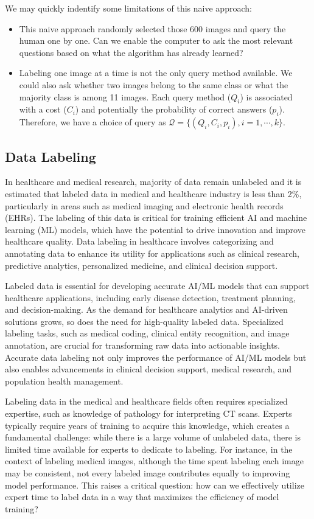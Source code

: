 \documentclass[12pt]{article}
\def\cal{\mathcal}
\def\calQ{{\cal Q}} %
\begin{document}
We may quickly indentify some limitations of this naive approach:

\begin{itemize}
	\item This naive approach randomly selected those 600 images and query the human one by one. Can we enable the computer to ask the most relevant questions based on what the algorithm has already learned? 
	\item Labeling one image at a time is not the only query method available. We could also ask whether two images belong to the same class or what the majority class is among 11 images. Each query method ($Q_i$) is associated with a cost ($C_i$) and potentially the probability of correct answers ($p_i$). Therefore, we have a choice of query as $\calQ = \{(Q_i, C_i, p_i), i=1,\cdots, k\}$. 
\end{itemize}


\subsection{Data Labeling}
In healthcare and medical research, majority of data remain unlabeled and it is estimated that labeled data in medical and healthcare industry is less than 2\%, particularly in areas such as medical imaging and electronic health records (EHRs). The labeling of this data is critical for training efficient AI and machine learning (ML) models, which have the potential to drive innovation and improve healthcare quality. Data labeling in healthcare involves categorizing and annotating data to enhance its utility for applications such as clinical research, predictive analytics, personalized medicine, and clinical decision support.

Labeled data is essential for developing accurate AI/ML models that can support healthcare applications, including early disease detection, treatment planning, and decision-making. As the demand for healthcare analytics and AI-driven solutions grows, so does the need for high-quality labeled data. Specialized labeling tasks, such as medical coding, clinical entity recognition, and image annotation, are crucial for transforming raw data into actionable insights. Accurate data labeling not only improves the performance of AI/ML models but also enables advancements in clinical decision support, medical research, and population health management.

Labeling data in the medical and healthcare fields often requires specialized expertise, such as knowledge of pathology for interpreting CT scans. Experts typically require years of training to acquire this knowledge, which creates a fundamental challenge: while there is a large volume of unlabeled data, there is limited time available for experts to dedicate to labeling. For instance, in the context of labeling medical images, although the time spent labeling each image may be consistent, not every labeled image contributes equally to improving model performance. This raises a critical question: how can we effectively utilize expert time to label data in a way that maximizes the efficiency of model training?
\end{document}
